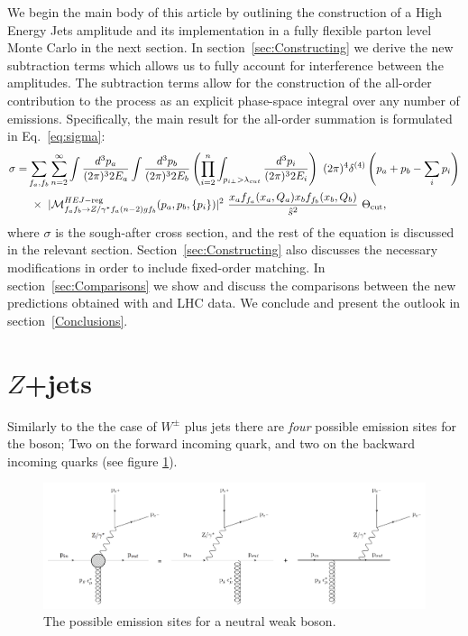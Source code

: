 	We begin the main body of this article by outlining the construction of a
	High Energy Jets amplitude and its implementation in a fully flexible parton
	level Monte Carlo in the next section.  In section~\ref{sec:Constructing} we
	derive the new subtraction terms which allows us to fully account for
	interference between the amplitudes. The subtraction terms allow for the
	construction of the all-order contribution to the process as an explicit
	phase-space integral over any number of emissions. Specifically, the
	main result for the all-order summation is formulated in
	Eq.~\eqref{eq:sigma}:
	\begin{align}
	  \nonumber
	  \begin{split}
	    \sigma =& \sum_{f_a,f_b} \sum_{n=2}^\infty \int \frac{d^3 p_a}{(2\pi)^3 2E_a} \int \frac{d^3
	      p_b}{(2\pi)^3 2E_b}  \left( \prod_{i=2}^n \int_{p_{i\perp}>\lambda_{cut}} \frac{d^3 p_i}{(2\pi)^3
	        2E_i} \right)\ (2\pi)^4 \delta^{(4)}\left(p_a+p_b - \sum_i p_i\right) \\
	    & \ \times \ |\mathcal{M}^{HEJ-{\rm reg}}_{f_af_b\to Z/\gamma^*
	      f_a(n-2)gf_b}(p_a,p_b,\{p_i\})|^2 \ \frac{ x_a f_{f_a}(x_a, Q_a) x_b
	      f_{f_b}(x_b,Q_b)}{\hat s^2}\ \Theta_{\rm cut},
	  \end{split}
	\end{align}
	where $\sigma$ is the sough-after cross
	section, and the rest of the equation is discussed in the relevant section. Section~\ref{sec:Constructing} also discusses the necessary
	modifications in order to include fixed-order matching. In
	section~\ref{sec:Comparisons} we show and discuss the comparisons between the new
	predictions obtained with \hej and LHC data. We conclude and present the
	outlook in section~\ref{Conclusions}.

\section{$Z$+jets}
	\label{sec:Zcurrents}

	Similarly to the the case of $W^\pm$ plus jets there are \emph{four} possible
	emission sites for the boson; Two on the forward incoming quark, and two on the
	backward incoming quarks (see figure \ref{fig:emissionsites}).

	\begin{figure}[h]
	\includegraphics[width=0.98\linewidth]{figures/EmissionSites.pdf}
	\caption{The possible emission sites for a neutral weak boson.}
	\label{fig:emissionsites}
	\end{figure}

